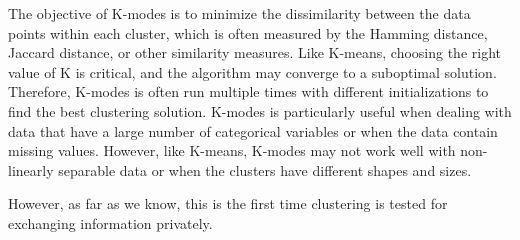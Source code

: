 The objective of K-modes is to minimize the dissimilarity between the data points within each cluster, which is often measured by the Hamming distance, Jaccard distance, or other similarity measures. Like K-means, choosing the right value of K is critical, and the algorithm may converge to a suboptimal solution. Therefore, K-modes is often run multiple times with different initializations to find the best clustering solution. K-modes is particularly useful when dealing with data that have a large number of categorical variables or when the data contain missing values. However, like K-means, K-modes may not work well with non-linearly separable data or when the clusters have different shapes and sizes.

However, as far as we know, this is the first time clustering is tested for exchanging information privately.
